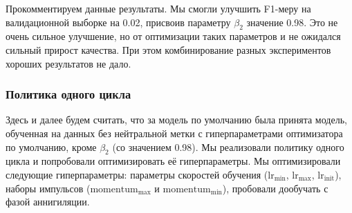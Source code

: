 \documentclass[a4paper,14pt]{extarticle}
\begin{document}
    Прокомментируем данные результаты. Мы смогли улучшить F1-меру на валидационной выборке на 0.02, присвоив параметру $\beta_2$ значение 0.98. Это не очень сильное улучшение, но от оптимизации таких параметров и не ожидался сильный прирост качества. При этом комбинирование разных экспериментов хороших результатов не дало.

    \subsubsection{Политика одного цикла}
    Здесь и далее будем считать, что за модель по умолчанию была принята модель, обученная на данных без нейтральной метки с гиперпараметрами оптимизатора по умолчанию, кроме $\beta_2$ (со значением 0.98). Мы реализовали политику одного цикла и попробовали оптимизировать её гиперпараметры. Мы оптимизировали следующие гиперпараметры: параметры скоростей обучения ($\text{lr}_\text{min}$, $\text{lr}_\text{max}$, $\text{lr}_\text{init}$), наборы импульсов ($\text{momentum}_\text{max}$ и $\text{momentum}_\text{min}$), пробовали дообучать с фазой аннигиляции.
\end{document}
